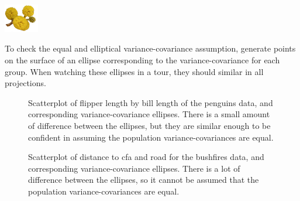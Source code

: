 \documentclass[
  letterpaper,
]{krantz}
\newenvironment{Shaded}{\begin{snugshade}}{\end{snugshade}}
\newcommand{\AttributeTok}[1]{\textcolor[rgb]{0.40,0.45,0.13}{#1}}
\newcommand{\CommentTok}[1]{\textcolor[rgb]{0.37,0.37,0.37}{#1}}
\newcommand{\ConstantTok}[1]{\textcolor[rgb]{0.56,0.35,0.01}{#1}}
\newcommand{\ControlFlowTok}[1]{\textcolor[rgb]{0.00,0.23,0.31}{#1}}
\newcommand{\DecValTok}[1]{\textcolor[rgb]{0.68,0.00,0.00}{#1}}
\newcommand{\FloatTok}[1]{\textcolor[rgb]{0.68,0.00,0.00}{#1}}
\newcommand{\FunctionTok}[1]{\textcolor[rgb]{0.28,0.35,0.67}{#1}}
\newcommand{\NormalTok}[1]{\textcolor[rgb]{0.00,0.23,0.31}{#1}}
\newcommand{\OtherTok}[1]{\textcolor[rgb]{0.00,0.23,0.31}{#1}}
\newcommand{\SpecialCharTok}[1]{\textcolor[rgb]{0.37,0.37,0.37}{#1}}
\newcommand{\infobox}[1]{%
\noindent\colorbox{info!30}{%
\begin{minipage}{0.98\linewidth}%
    \centering%
    \begin{minipage}[c]{0.15\linewidth} %
      \includegraphics[width=1.5cm]{images/mulga-flowers2.png} %
    \end{minipage}%
    \hfill %
    \begin{minipage}[c]{0.8\linewidth} %
      \bigskip%
      \textsf{#1}%
      \bigskip%
    \end{minipage}%
    \hspace*{3mm}%
  \end{minipage}%
}%
}
\begin{document}
\infobox{To check the equal and elliptical variance-covariance assumption, generate points on the surface of an ellipse corresponding to the variance-covariance for each group. When watching these ellipses in a tour, they should similar in all projections.
}

 

\begin{Shaded}
\end{Shaded}

\begin{figure}


\caption{\label{fig-lda-assumptions1}Scatterplot of flipper length by
bill length of the penguins data, and corresponding variance-covariance
ellipses. There is a small amount of difference between the ellipses,
but they are similar enough to be confident in assuming the population
variance-covariances are equal.}

\end{figure}%

\begin{figure}


\caption{\label{fig-lda-assumptions2}Scatterplot of distance to cfa and
road for the bushfires data, and corresponding variance-covariance
ellipses. There is a lot of difference between the ellipses, so it
cannot be assumed that the population variance-covariances are equal.}

\end{figure}%
\end{document}
